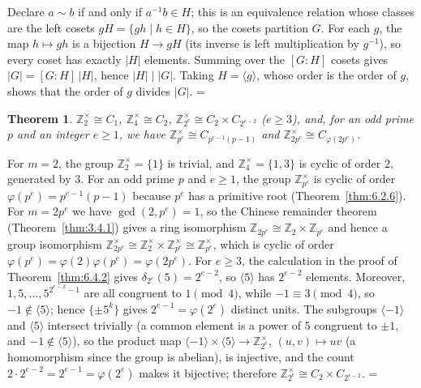 \documentclass[11pt]{article}
\makeatletter
\let\nt@closedisplay\]
\def\nt@guardedclose{\@ifnextchar\par{\nt@closeafterpar}{\@ifnextchar\end{\postdisplaypenalty\@M\nt@closedisplay}{\nt@closedisplay}}}
\def\nt@closeafterpar\par{\@ifnextchar\par{\nt@closeafterpar}{\@ifnextchar\end{\postdisplaypenalty\@M\nt@closedisplay\par}{\nt@closedisplay\par}}}
\renewenvironment{proof}[1][\proofname]{\par
  \pushQED{\qed}\normalfont\topsep\medskipamount\edef\nt@afterproof{\@endparpenalty=\the\@endparpenalty\relax}\@beginparpenalty\@M\@endparpenalty\@M\let\]\nt@guardedclose\trivlist\item[]\textit{#1\@addpunct{.}} \ignorespaces}{\ifvmode\addpenalty\@M\fi\popQED\nt@afterproof\endtrivlist\@endpefalse}
\theoremstyle{ntstyle}
\newtheorem{theorem}{Theorem}[subsection]
\newcommand{\ZmodUnits}[1]{\mathbb{Z}_{#1}^{\times}}
\makeatother
\begin{document}
\begin{proof} Declare $a \sim b$ if and only if $a^{-1}b \in H$;
  this is an equivalence relation whose classes are the left cosets
  $gH = \{gh \mid h \in H\}$, so the cosets partition $G$. For each $g$,
  the map $h \mapsto gh$ is a bijection $H \to gH$ (its inverse is left
  multiplication by $g^{-1}$), so every coset has exactly $|H|$
  elements. Summing over the $[G:H]$ cosets gives $|G| = [G:H]\,|H|$,
  hence $|H| \mid |G|$. Taking $H = \langle g\rangle$, whose order is
  the order of $g$, shows that the order of $g$ divides $|G|$.
\end{proof}

\begin{theorem}\label{thm:6.6.3} $\ZmodUnits{2} \cong C_1$,
  $\ZmodUnits{4} \cong C_2$, $\ZmodUnits{2^{e}} \cong C_2 \times C_{2^{e-2}}$ ($e \ge 3$), and, for an odd prime $p$ and
  an integer $e\ge1$,
  we have $\ZmodUnits{p^{e}} \cong C_{p^{e-1}(p-1)}$ and $\ZmodUnits{2 p^{e}} \cong C_{\varphi(2p^{e})}$.

\end{theorem}

\begin{proof} For $m = 2$, the group $\ZmodUnits{2} = \{1\}$ is trivial, and $\ZmodUnits{4} = \{1, 3\}$ is cyclic of
  order $2$, generated by $3$. For an odd prime $p$ and $e \ge 1$, the
  group $\ZmodUnits{p^{e}}$ is cyclic of order $\varphi(p^{e}) = p^{e-1}(p-1)$ because $p^{e}$ has a primitive root
  (Theorem~\ref{thm:6.2.6}). For
  $m = 2p^{e}$ we have $\gcd(2, p^{e}) = 1$, so the Chinese remainder
  theorem (Theorem~\ref{thm:3.4.1}) gives a ring isomorphism
  $\mathbb{Z}_{2p^{e}} \cong \mathbb{Z}_2 \times \mathbb{Z}_{p^{e}}$ and hence a group isomorphism
  $\ZmodUnits{2p^{e}} \cong \ZmodUnits{2} \times \ZmodUnits{p^{e}} \cong \ZmodUnits{p^{e}}$, which is
  cyclic of order $\varphi(p^{e}) = \varphi(2)\varphi(p^{e}) = \varphi(2p^{e})$. For $e \ge 3$, the calculation in
  the proof of
  Theorem~\ref{thm:6.4.2} gives $\delta_{2^e}(5)=2^{e-2}$, so
  $\langle5\rangle$ has $2^{e-2}$ elements. Moreover, $1, 5, \ldots, 5^{2^{e-2}-1}$ are all congruent to
  $1 \pmod{4}$, while $-1 \equiv 3 \pmod{4}$, so $-1 \notin \langle 5 \rangle$; hence $\{\pm 5^{k}\}$
  gives $2^{e-1} = \varphi(2^{e})$ distinct units. The subgroups
  $\langle-1\rangle$ and $\langle5\rangle$ intersect trivially (a common
  element is a power of $5$ congruent to $\pm1$, and
  $-1\notin\langle5\rangle$), so the product map
  $\langle-1\rangle\times\langle5\rangle\to\ZmodUnits{2^{e}}$,
  $(u,v)\mapsto uv$ (a homomorphism since the group is abelian), is
  injective, and the count $2\cdot2^{e-2}=2^{e-1}=\varphi(2^{e})$ makes
  it bijective; therefore
  $\ZmodUnits{2^{e}} \cong C_2 \times C_{2^{e-2}}$.
\end{proof}
\end{document}
